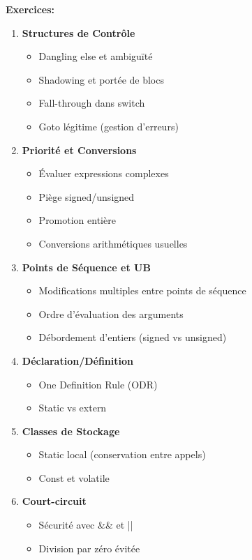 \documentclass[10pt,a4paper]{article}
\begin{document}
\textbf{Exercices:}
\begin{enumerate}
\item \textbf{Structures de Contrôle}
   \begin{itemize}
   \item Dangling else et ambiguïté
   \item Shadowing et portée de blocs
   \item Fall-through dans switch
   \item Goto légitime (gestion d'erreurs)
   \end{itemize}

\item \textbf{Priorité et Conversions}
   \begin{itemize}
   \item Évaluer expressions complexes
   \item Piège signed/unsigned
   \item Promotion entière
   \item Conversions arithmétiques usuelles
   \end{itemize}

\item \textbf{Points de Séquence et UB}
   \begin{itemize}
   \item Modifications multiples entre points de séquence
   \item Ordre d'évaluation des arguments
   \item Débordement d'entiers (signed vs unsigned)
   \end{itemize}

\item \textbf{Déclaration/Définition}
   \begin{itemize}
   \item One Definition Rule (ODR)
   \item Static vs extern
   \end{itemize}

\item \textbf{Classes de Stockage}
   \begin{itemize}
   \item Static local (conservation entre appels)
   \item Const et volatile
   \end{itemize}

\item \textbf{Court-circuit}
   \begin{itemize}
   \item Sécurité avec \&\& et ||
   \item Division par zéro évitée
   \end{itemize}
\end{enumerate}
\end{document}
